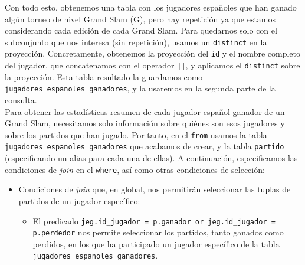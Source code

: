 \documentclass[11pt]{opticajnl}
\begin{document}
Con todo esto, obtenemos una tabla con los jugadores españoles que han ganado algún torneo de nivel Grand Slam (G), pero hay repetición ya que estamos considerando cada edición de cada Grand Slam. Para quedarnos solo con el subconjunto que nos interesa (sin repetición), usamos un \texttt{distinct} en la proyección. Concretamente, obtenemos la proyección del \texttt{id} y el nombre completo del jugador, que concatenamos con el operador \texttt{||}, y aplicamos el \texttt{distinct} sobre la proyección. Esta tabla resultado la guardamos como \texttt{jugadores\_espanoles\_ganadores}, y la usaremos en la segunda parte de la consulta. \\

Para obtener las estadísticas resumen de cada jugador español ganador de un Grand Slam, necesitamos solo información sobre quiénes son esos jugadores y sobre los partidos que han jugado. Por tanto, en el \texttt{from} usamos la tabla \texttt{jugadores\_espanoles\_ganadores} que acabamos de crear, y la tabla \texttt{partido} (especificando un alias para cada una de ellas). A continuación, especificamos las condiciones de \textit{join} en el \texttt{where}, así como otras condiciones de selección:
\begin{itemize}
\item Condiciones de \textit{join} que, en global, nos permitirán seleccionar las tuplas de partidos de un jugador específico:
\begin{itemize}
\item El predicado \texttt{jeg.id\_jugador = p.ganador or jeg.id\_jugador = p.perdedor} nos permite seleccionar los partidos, tanto ganados como perdidos, en los que ha participado un jugador específico de la tabla \texttt{jugadores\_espanoles\_ganadores}.
\end{itemize}
\end{itemize}
\end{document}
